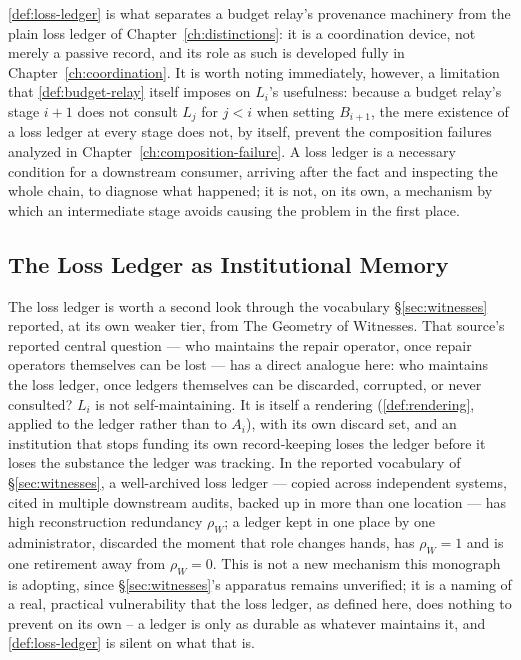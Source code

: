 \cref{def:loss-ledger} is what separates a budget relay's provenance
machinery from the plain loss ledger of Chapter~\ref{ch:distinctions}: it
is a coordination device, not merely a passive record, and its role as
such is developed fully in Chapter~\ref{ch:coordination}. It is worth
noting immediately, however, a limitation that \cref{def:budget-relay}
itself imposes on $L_i$'s usefulness: because a budget relay's stage $i+1$
does not consult $L_j$ for $j < i$ when setting $B_{i+1}$, the mere
existence of a loss ledger at every stage does not, by itself, prevent the
composition failures analyzed in Chapter~\ref{ch:composition-failure}. A
loss ledger is a necessary condition for a downstream consumer, arriving
after the fact and inspecting the whole chain, to diagnose what happened;
it is not, on its own, a mechanism by which an intermediate stage avoids
causing the problem in the first place.

\subsection{The Loss Ledger as Institutional Memory}
\label{sec:ledger-as-witness}

The loss ledger is worth a second look through the vocabulary
\S\ref{sec:witnesses} reported, at its own weaker tier, from The
Geometry of Witnesses. That source's reported central question --- who
maintains the repair operator, once repair operators themselves can be
lost --- has a direct analogue here: who maintains the loss ledger, once
ledgers themselves can be discarded, corrupted, or never consulted?
$L_i$ is not self-maintaining. It is itself a rendering
(\cref{def:rendering}, applied to the ledger rather than to $A_i$), with
its own discard set, and an institution that stops funding its own
record-keeping loses the ledger before it loses the substance the ledger
was tracking. In the reported vocabulary of \S\ref{sec:witnesses}, a
well-archived loss ledger --- copied across independent systems, cited
in multiple downstream audits, backed up in more than one location --- has
high reconstruction redundancy $\rho_W$; a ledger kept in one place by one
administrator, discarded the moment that role changes hands, has $\rho_W =
1$ and is one retirement away from $\rho_W = 0$. This is not a new
mechanism this monograph is adopting, since \S\ref{sec:witnesses}'s
apparatus remains unverified; it is a naming of a real, practical
vulnerability that the loss ledger, as defined here, does nothing to
prevent on its own -- a ledger is only as durable as whatever maintains
it, and \cref{def:loss-ledger} is silent on what that is.

